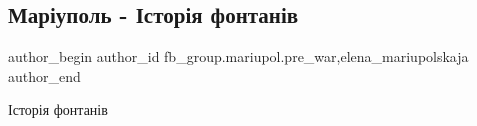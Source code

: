  
 
 
 
 

\subsection{Маріуполь - Історія фонтанів}
\label{sec:17_01_2023.fb.fb_group.mariupol.pre_war.2.mar_upol____stor_ya_}
 
\ifcmt
 author_begin
   author_id fb_group.mariupol.pre_war,elena_mariupolskaja
 author_end
\fi

Історія фонтанів
